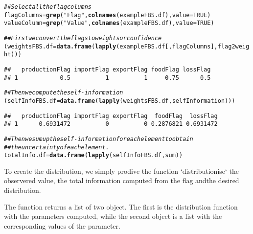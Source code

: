 \documentclass[nojss]{jss}\usepackage[]{graphicx}\usepackage[]{color}
\makeatletter
\newcommand{\hlnum}[1]{\textcolor[rgb]{0.686,0.059,0.569}{#1}}%
\newcommand{\hlstr}[1]{\textcolor[rgb]{0.192,0.494,0.8}{#1}}%
\newcommand{\hlcom}[1]{\textcolor[rgb]{0.678,0.584,0.686}{\textit{#1}}}%
\newcommand{\hlstd}[1]{\textcolor[rgb]{0.345,0.345,0.345}{#1}}%
\newcommand{\hlkwb}[1]{\textcolor[rgb]{0.69,0.353,0.396}{#1}}%
\newcommand{\hlkwc}[1]{\textcolor[rgb]{0.333,0.667,0.333}{#1}}%
\newcommand{\hlkwd}[1]{\textcolor[rgb]{0.737,0.353,0.396}{\textbf{#1}}}%
\newenvironment{kframe}{%
 \def\at@end@of@kframe{}%
 \ifinner\ifhmode%
  \def\at@end@of@kframe{\end{minipage}}%
  \begin{minipage}{\columnwidth}%
 \fi\fi%
 \def\FrameCommand##1{\hskip\@totalleftmargin \hskip-\fboxsep
 \colorbox{shadecolor}{##1}\hskip-\fboxsep
     \hskip-\linewidth \hskip-\@totalleftmargin \hskip\columnwidth}%
 \MakeFramed {\advance\hsize-\width
   \@totalleftmargin\z@ \linewidth\hsize
   \@setminipage}}%
 {\par\unskip\endMakeFramed%
 \at@end@of@kframe}
\newenvironment{knitrout}{}{} %
\makeatother
\begin{document}
\begin{knitrout}
\color{fgcolor}\begin{kframe}
\begin{alltt}
\hlcom{## Select all the flag columns}
\hlstd{flagColumns} \hlkwb{=} \hlkwd{grep}\hlstd{(}\hlstr{"Flag"}\hlstd{,} \hlkwd{colnames}\hlstd{(exampleFBS.df),} \hlkwc{value} \hlstd{=} \hlnum{TRUE}\hlstd{)}
\hlstd{valueColumn} \hlkwb{=} \hlkwd{grep}\hlstd{(}\hlstr{"Value"}\hlstd{,} \hlkwd{colnames}\hlstd{(exampleFBS.df),} \hlkwc{value} \hlstd{=} \hlnum{TRUE}\hlstd{)}

\hlcom{## First we convert the flags to weights or confidence}
\hlstd{(weightsFBS.df} \hlkwb{=} \hlkwd{data.frame}\hlstd{(}\hlkwd{lapply}\hlstd{(exampleFBS.df[, flagColumns], flag2weight)))}
\end{alltt}
\begin{verbatim}
##   productionFlag importFlag exportFlag foodFlag lossFlag
## 1            0.5          1          1     0.75      0.5
\end{verbatim}
\begin{alltt}
\hlcom{## Then we compute the self-information}
\hlstd{(selfInfoFBS.df} \hlkwb{=} \hlkwd{data.frame}\hlstd{(}\hlkwd{lapply}\hlstd{(weightsFBS.df, selfInformation)))}
\end{alltt}
\begin{verbatim}
##   productionFlag importFlag exportFlag  foodFlag  lossFlag
## 1      0.6931472          0          0 0.2876821 0.6931472
\end{verbatim}
\begin{alltt}
\hlcom{## Then we sum up the self-information for each element to obtain }
\hlcom{## the uncertainty of each element.}
\hlstd{totalInfo.df} \hlkwb{=} \hlkwd{data.frame}\hlstd{(}\hlkwd{lapply}\hlstd{(selfInfoFBS.df, sum))}
\end{alltt}
\end{kframe}
\end{knitrout}


To create the distribution, we simply prodive the function
`distributionise` the observered value, the total information computed
from the flag andthe desired distribution.

The function returns a list of two object. The first is the
distribution function with the parameters computed, while the second
object is a list with the corresponding values of the parameter.
\end{document}
